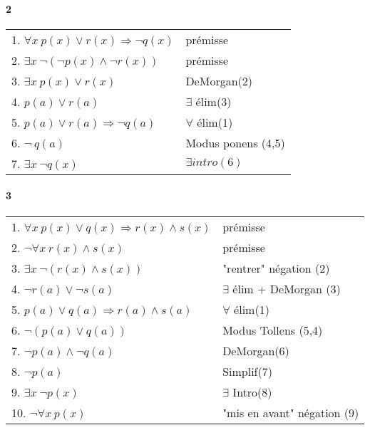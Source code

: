         \paragraph{2}
        
            \begin{tabular}{|l|l|}
            \hline
            1. $\forall x \  p(x) \lor r(x) \Rightarrow \neg q(x)$ & prémisse \\
            2. $\exists x \  \neg (\neg p(x) \land \neg r(x))$ & prémisse \\
            3. $\exists x \  p(x) \lor r(x)$ & DeMorgan(2) \\
            4. $p(a) \lor r(a)$ & $\exists$ élim(3) \\ 
            5. $p(a) \lor r(a) \Rightarrow \neg q(a)$ & $\forall$ élim(1) \\
            6. $\neg \ q(a)$ & Modus ponens (4,5)\\
            7. $\exists x \  \neg q(x)$ & $\exists intro(6)$\\
            \hline
            \end{tabular}
            
        \paragraph{3}
            \begin{tabular}{|l|l|}
            \hline
            1. $ \forall x \ p(x) \lor q(x) \Rightarrow r(x) \land s(x) $ & prémisse \\
            2. $ \lnot \forall x \ r(x) \land s(x) $ & prémisse \\
            3. $ \exists x \ \neg  (r(x) \land s(x)) $ & "rentrer" négation (2) \\
            4. $ \neg r(a) \lor \neg s(a) $ & $\exists$ élim + DeMorgan (3) \\
            5. $ p(a) \lor q(a) \Rightarrow r(a) \land s(a) $ & $\forall$ élim(1) \\
            6. $ \neg (p(a) \lor q(a)) $ & Modus Tollens (5,4) \\
            7. $ \neg p(a) \land \neg q(a) $ & DeMorgan(6) \\
            8. $ \neg p(a) $ & Simplif(7)\\
            9. $ \exists x \ \neg p(x) $ & $\exists$ Intro(8) \\
            10. $ \neg \forall x \ p(x) $ & "mis en avant" négation (9)\\
            \hline
            \end{tabular}
        
